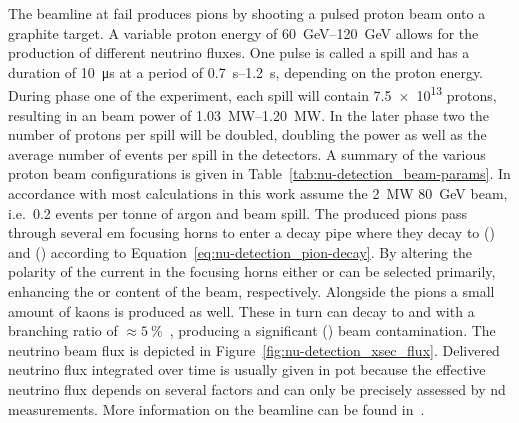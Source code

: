 The beamline at \gls{fail} produces pions by shooting a pulsed proton beam onto a graphite target.
A variable proton energy of \SIrange{60}{120}{\giga\electronvolt} allows for the production of different neutrino fluxes.
One pulse is called a spill and has a duration of \SI{10}{\micro\second} at a period of \SIrange{0.7}{1.2}{\second}, depending on the proton energy.
During phase one of the experiment, each spill will contain \num{7.5e13} protons, resulting in an beam power of \SIrange{1.03}{1.20}{\mega\watt}.
In the later phase two the number of protons per spill will be doubled, doubling the power as well as the average number of events per spill in the detectors.
A summary of the various proton beam configurations is given in Table~\ref{tab:nu-detection_beam-params}.
In accordance with \cite{dune2} most calculations in this work assume the \SI{2}{\mega\watt} \SI{80}{\giga\electronvolt} beam, i.e.\ \num{0.2} events per tonne of argon and beam spill.
The produced pions pass through several \gls{em} focusing horns to enter a decay pipe where they decay to \Pgmp(\Pgmm) and \Pgngm(\Pagngm) according to Equation~\eqref{eq:nu-detection_pion-decay}.
By altering the polarity of the current in the focusing horns either \Pgpp or \Pgpm can be selected primarily, enhancing the \Pgngm or \Pagngm content of the beam, respectively.
Alongside the pions a small amount of kaons is produced as well.
These in turn can decay to \Pgne and \Pagne with a branching ratio of $\approx\SI{5}{\percent}$~\cite{pdg}, producing a significant \Pgne (\Pagne) beam contamination.
The neutrino beam flux is depicted in Figure~\ref{fig:nu-detection_xsec_flux}.
Delivered neutrino flux integrated over time is usually given in \gls{pot} because the effective neutrino flux depends on several factors and can only be precisely assessed by \gls{nd} measurements.
More information on the beamline can be found in~\cite{dune2}.

